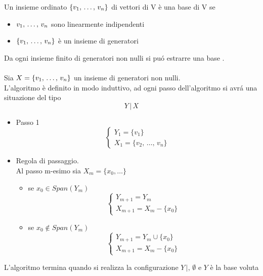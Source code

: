 \spazio
\begin{defn}[Base]\bianco 
Un insieme ordinato $ \{ v_1, \, \dots , \, v_n \} $  di vettori di V \`e una base di V  se 
\begin{itemize}
\item $ v_1, \, \dots , \, v_n $ sono linearmente indipendenti 
\item  $\{ v_1, \, \dots , \, v_n \} $ \`e un insieme di generatori
\end{itemize}
\end{defn}
\newpage
\begin{prop} \bianco
Da ogni insieme finito di generatori non nulli si pu\'o estrarre una base .\\ \\ 
Sia $ X= \{ v_1, \, \dots , \, v_n \} $ un insieme di generatori non nulli.\\
L'algoritmo \`e definito in modo induttivo, ad ogni passo dell'algoritmo si avr\'a una situazione del tipo $$ Y \, \vert \, X $$
\begin{itemize}
\item Passo 1 
$$ \begin{cases} Y_1 = \{ v_1 \} \\ X_1 =\{ v_2,\, \dots, \, v_n \} 
\end{cases} $$
\item Regola di passaggio.\\
Al passo m-esimo sia $X_m =\{ x_0 , \dots \} $
\begin{itemize}
\item se $ x_0 \in Span (Y_m ) $  $$ \begin{cases} Y_{m+1}=Y_m  \\ X_{m+1} = X_m - \{ x_0 \}   \end{cases}$$
\item se $ x_0 \not \in Span (Y_m ) $  $$ \begin{cases} Y_{m+1}=Y_m \cup \{ x_0 \}   \\ X_{m+1} = X_m - \{ x_0 \}   \end{cases}$$
 
 \end{itemize}

\end{itemize}
L'algoritmo termina quando si realizza la configurazione $ Y \, \vert , \, \emptyset$ e $Y$ \`e la base voluta 
\end{prop}
